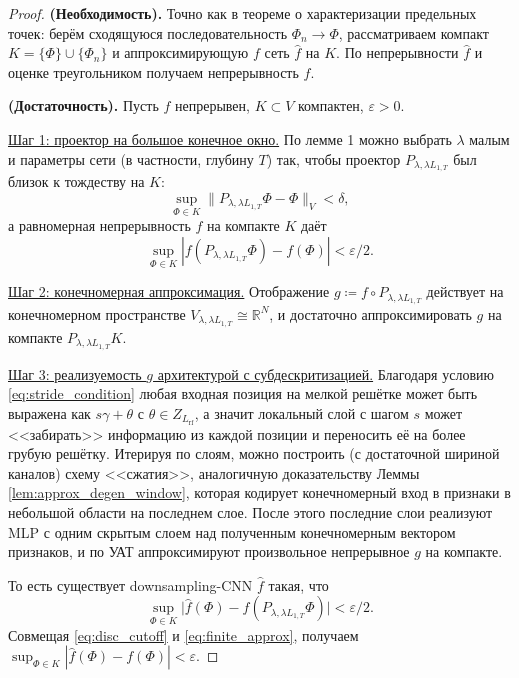 \documentclass[../NDCNNAI_main.tex]{subfiles}
\begin{document}
\begin{proof}
\textbf{(Необходимость).}
Точно как в теореме о характеризации предельных точек: берём сходящуюся последовательность $\Phi_n\to\Phi$,
рассматриваем компакт $K=\{\Phi\}\cup\{\Phi_n\}$ и аппроксимирующую $f$ сеть $\widehat f$ на $K$.
По непрерывности $\widehat f$ и оценке треугольником получаем непрерывность $f$.

\textbf{(Достаточность).}
Пусть $f$ непрерывен, $K\subset V$ компактен, $\varepsilon>0$.

\underline{Шаг 1: проектор на большое конечное окно.}
По лемме 1 можно выбрать $\lambda$ малым и параметры сети (в частности, глубину $T$)
так, чтобы проектор $P_{\lambda,\lambda L_{1,T}}$ был близок к тождеству на $K$:
\[
\sup_{\Phi\in K}\|P_{\lambda,\lambda L_{1,T}}\Phi-\Phi\|_V<\delta,
\]
а равномерная непрерывность $f$ на компакте $K$ даёт
\begin{equation}
\sup_{\Phi\in K}|f(P_{\lambda,\lambda L_{1,T}}\Phi)-f(\Phi)|<\varepsilon/2.
\label{eq:disc_cutoff}  
\end{equation}

\underline{Шаг 2: конечномерная аппроксимация.}
Отображение $g\coloneq f\circ P_{\lambda,\lambda L_{1,T}}$ действует на конечномерном пространстве
$V_{\lambda,\lambda L_{1,T}}\cong\mathbb{R}^N$, и достаточно аппроксимировать $g$ на компакте
$P_{\lambda,\lambda L_{1,T}}K$.

\underline{Шаг 3: реализуемость $g$ архитектурой с субдескритизацией.}
Благодаря условию \eqref{eq:stride_condition} любая входная позиция на мелкой решётке
может быть выражена как $s\gamma+\theta$ с $\theta\in Z_{L_{\mathrm{rf}}}$,
а значит локальный слой с шагом $s$ может <<забирать>> информацию из каждой позиции и переносить её на более грубую решётку.
Итерируя по слоям, можно построить (с достаточной шириной каналов) схему <<сжатия>>,
аналогичную доказательству Леммы \ref{lem:approx_degen_window}, которая кодирует конечномерный вход
в признаки в небольшой области на последнем слое.
После этого последние слои реализуют MLP с одним скрытым слоем над полученным конечномерным вектором признаков,
и по УАТ аппроксимируют произвольное непрерывное $g$ на компакте.

То есть существует downsampling-CNN $\widehat f$ такая, что
\begin{equation}
\sup_{\Phi\in K}\big|\widehat f(\Phi)-f(P_{\lambda,\lambda L_{1,T}}\Phi)\big|<\varepsilon/2.
\label{eq:finite_approx}  
\end{equation}
Совмещая \eqref{eq:disc_cutoff} и \eqref{eq:finite_approx}, получаем
$\sup_{\Phi\in K}|\widehat f(\Phi)-f(\Phi)|<\varepsilon$.  
\end{proof}
\end{document}
